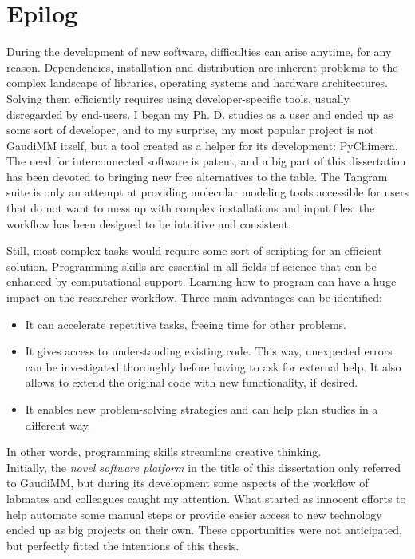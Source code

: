 \chapter*{Epilog}
\label{chap:epilog}

During the development of new software, difficulties can arise anytime, for any reason. Dependencies, installation and distribution are inherent problems to the complex landscape of libraries, operating systems and hardware architectures. Solving them efficiently requires using developer-specific tools, usually disregarded by end-users. I began my Ph. D. studies as a user and ended up as some sort of developer, and to my surprise, my most popular project is not GaudiMM itself, but a tool created as a helper for its development: PyChimera. The need for interconnected software is patent, and a big part of this dissertation has been devoted to bringing new free alternatives to the table. The Tangram suite is only an attempt at providing molecular modeling tools accessible for users that do not want to mess up with complex installations and input files: the workflow has been designed to be intuitive and consistent.

Still, most complex tasks would require some sort of scripting for an efficient solution. Programming skills are essential in all fields of science that can be enhanced by computational support. Learning how to program can have a huge impact on the researcher workflow. Three main advantages can be identified:

\begin{itemize}
    \item It can accelerate repetitive tasks, freeing time for other problems.
    \item It gives access to understanding existing code. This way, unexpected errors can be investigated thoroughly before having to ask for external help. It also allows to extend the original code with new functionality, if desired.
    \item It enables new problem-solving strategies and can help plan studies in a different way.
\end{itemize}

In other words, programming skills streamline creative thinking. \\

Initially, the \textit{novel software platform} in the title of this dissertation only referred to GaudiMM, but during its development some aspects of the workflow of labmates and colleagues caught my attention. What started as innocent efforts to help automate some manual steps or provide easier access to new technology ended up as big projects on their own. These opportunities were not anticipated, but perfectly fitted the intentions of this thesis.

